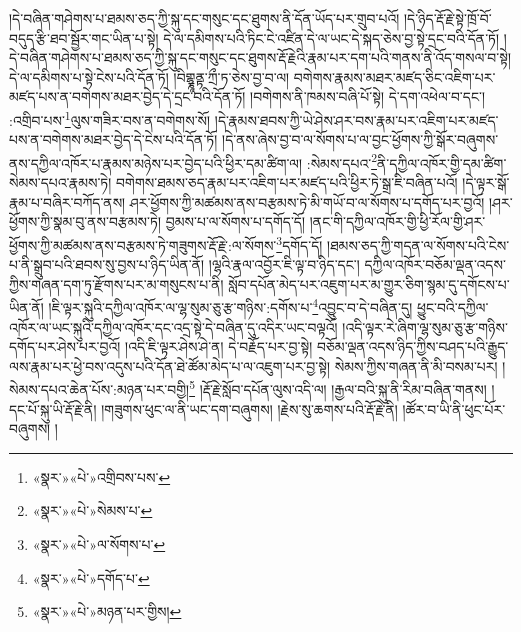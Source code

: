 །དེ་བཞིན་གཤེགས་པ་ཐམས་ཅད་ཀྱི་སྐུ་དང་གསུང་དང་ཐུགས་ནི་དོན་ཡོད་པར་གྲུབ་པའོ། །དེ་ཉིད་རྡོ་རྗེ་སྟེ་ཁྲོ་བོ་བདུད་རྩི་ཐབ་སྦྱོར་གང་ཡིན་པ་སྟེ། དེ་ལ་དམིགས་པའི་ཏིང་ངེ་འཛིན་དེ་ལ་ཡང་དེ་སྐད་ཅེས་བྱ་སྟེ་དྲང་བའི་དོན་ཏོ། །དེ་བཞིན་གཤེགས་པ་ཐམས་ཅད་ཀྱི་སྐུ་དང་གསུང་དང་ཐུགས་རྡོ་རྗེའི་རྣམ་པར་དག་པའི་གནས་ནི་འོད་གསལ་བ་སྟེ། དེ་ལ་དམིགས་པ་སྟེ་ངེས་པའི་དོན་ཏོ། །བིགྷྣཱནྟ་ཀྲྀ་ཏ་ཅེས་བྱ་བ་ལ། བགེགས་རྣམས་མཐར་མཛད་ཅིང་འཇིག་པར་མཛད་པས་ན་བགེགས་མཐར་བྱེད་དེ་དྲང་བའི་དོན་ཏོ། །བགེགས་ནི་ཁམས་བཞི་པོ་སྟེ། དེ་དག་འཕེལ་བ་དང་། :འགྲིབ་པས་\footnote{«སྣར་»«པེ་»འགྲིབས་པས་}ལུས་གཟིར་བས་ན་བགེགས་སོ། །དེ་རྣམས་ཐབས་ཀྱི་ཡེ་ཤེས་ཤར་བས་རྣམ་པར་འཇིག་པར་མཛད་པས་ན་བགེགས་མཐར་བྱེད་དེ་ངེས་པའི་དོན་ཏོ། །དེ་ནས་ཞེས་བྱ་བ་ལ་སོགས་པ་ལ་བྱང་ཕྱོགས་ཀྱི་སྒོར་བཞུགས་ནས་དཀྱིལ་འཁོར་པ་རྣམས་མཉེས་པར་བྱེད་པའི་ཕྱིར་དམ་ཚིག་ལ། :སེམས་དཔའ་\footnote{«སྣར་»«པེ་»སེམས་པ་}ནི་དཀྱིལ་འཁོར་གྱི་དམ་ཚིག་སེམས་དཔའ་རྣམས་ཏེ། བགེགས་ཐམས་ཅད་རྣམ་པར་འཇིག་པར་མཛད་པའི་ཕྱིར་ཏེ་སྒྲ་ཇི་བཞིན་པའོ། །དེ་ལྟར་སྒོ་རྣམ་པ་བཞིར་བཀོད་ནས། ཤར་ཕྱོགས་ཀྱི་མཚམས་ནས་བརྩམས་ཏེ་མི་གཡོ་བ་ལ་སོགས་པ་དགོད་པར་བྱའོ། །ཤར་ཕྱོགས་ཀྱི་སྣམ་བུ་ནས་བརྩམས་ཏེ། བྱམས་པ་ལ་སོགས་པ་དགོད་དོ། །ནང་གི་དཀྱིལ་འཁོར་གྱི་ཕྱི་རོལ་གྱི་ཤར་ཕྱོགས་ཀྱི་མཚམས་ནས་བརྩམས་ཏེ་གཟུགས་རྡོ་རྗེ་:ལ་སོགས་\footnote{«སྣར་»«པེ་»ལ་སོགས་པ་}དགོད་དོ། །ཐམས་ཅད་ཀྱི་གདན་ལ་སོགས་པའི་ངེས་པ་ནི་སྒྲུབ་པའི་ཐབས་སུ་བྱས་པ་ཉིད་ཡིན་ནོ། །ལྷའི་རྣལ་འབྱོར་ཇི་ལྟ་བ་ཉིད་དང་། དཀྱིལ་འཁོར་བཅོམ་ལྡན་འདས་ཀྱིས་གཞན་དག་ཏུ་རྫོགས་པར་མ་གསུངས་པ་ནི། སློབ་དཔོན་མེད་པར་འཇུག་པར་མ་གྱུར་ཅིག་སྙམ་དུ་དགོངས་པ་ཡིན་ནོ། །ཇི་ལྟར་སྐུའི་དཀྱིལ་འཁོར་ལ་ལྷ་སུམ་ཅུ་རྩ་གཉིས་:དགོས་པ་\footnote{«སྣར་»«པེ་»དགོད་པ་}འབྱུང་བ་དེ་བཞིན་དུ། ཕྱུང་བའི་དཀྱིལ་འཁོར་ལ་ཡང་སྐུའི་དཀྱིལ་འཁོར་དང་འདྲ་སྟེ་དེ་བཞིན་དུ་འདིར་ཡང་བལྟའོ། །འདི་ལྟར་རེ་ཞིག་ལྷ་སུམ་ཅུ་རྩ་གཉིས་དགོད་པར་ཤེས་པར་བྱའོ། །འདི་ཇི་ལྟར་ཤེས་ཤེ་ན། དེ་བརྗོད་པར་བྱ་སྟེ། བཅོམ་ལྡན་འདས་ཉིད་ཀྱིས་བཤད་པའི་རྒྱུད་ལས་རྣམ་པར་ཕྱེ་བས་འདུས་པའི་དོན་ཐེ་ཚོམ་མེད་པ་ལ་འཇུག་པར་བྱ་སྟེ། སེམས་ཀྱིས་གཞན་ནི་མི་བསམ་པར། །སེམས་དཔའ་ཆེན་པོས་:མཉན་པར་བགྱི།\footnote{«སྣར་»«པེ་»མཉན་པར་གྱིས།} །རྡོ་རྗེ་སློབ་དཔོན་ལུས་འདི་ལ། །རྒྱལ་བའི་སྐུ་ནི་རིམ་བཞིན་གནས། །དང་པོ་སྐུ་ཡི་རྡོ་རྗེ་ནི། །གཟུགས་ཕུང་ལ་ནི་ཡང་དག་བཞུགས། །རྗེས་སུ་ཆགས་པའི་རྡོ་རྗེ་ནི། །ཚོར་བ་ཡི་ནི་ཕུང་པོར་བཞུགས། །
